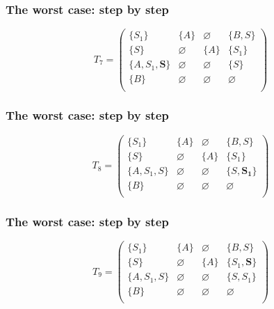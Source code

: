 \documentclass[xcolor=table]{beamer}
\begin{document}
\begin{frame}[noframenumbering]

  \frametitle{The worst case: step by step}
\begin{figure}[h]
\[
T_7 = \begin{pmatrix}
\{S_1\}     & \{A\}       & \varnothing & \{B, S\}    \\
\{S\}       & \varnothing & \{A\}       & \{S_1\}     \\
\{A, S_1, \pmb{S}\}  & \varnothing & \varnothing & \{S\}    \\
\{B\}       & \varnothing & \varnothing & \varnothing \\
\end{pmatrix}
\]
\label{ExampleQueryFirstIteration}
\end{figure}
\end{frame}

\begin{frame}[noframenumbering]

  \frametitle{The worst case: step by step}
\begin{figure}[h]
\[
T_8 = \begin{pmatrix}
\{S_1\}     & \{A\}       & \varnothing & \{B, S\}    \\
\{S\}       & \varnothing & \{A\}       & \{S_1\}     \\
\{A, S_1, S\}  & \varnothing & \varnothing & \{S, \pmb{S_1}\} \\
\{B\}       & \varnothing & \varnothing & \varnothing \\
\end{pmatrix}
\]
\label{ExampleQueryFirstIteration}
\end{figure}
\end{frame}

\begin{frame}[noframenumbering]

  \frametitle{The worst case: step by step}
\begin{figure}[h]
\[
T_9 = \begin{pmatrix}
\{S_1\}     & \{A\}       & \varnothing & \{B, S\}    \\
\{S\}       & \varnothing & \{A\}       & \{S_1, \pmb{S}\}     \\
\{A, S_1, S\}  & \varnothing & \varnothing & \{S, S_1\} \\
\{B\}       & \varnothing & \varnothing & \varnothing \\
\end{pmatrix}
\]
\label{ExampleQueryFirstIteration}
\end{figure}
\end{frame}
\end{document}
